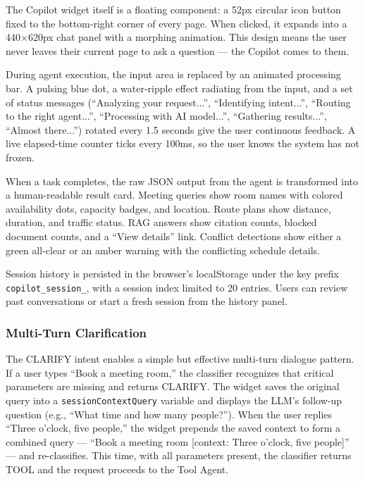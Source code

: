 The Copilot widget itself is a floating component: a 52px circular icon button fixed to the bottom-right corner of every page. When clicked, it expands into a 440$\times$620px chat panel with a morphing animation. This design means the user never leaves their current page to ask a question --- the Copilot comes to them.

During agent execution, the input area is replaced by an animated processing bar. A pulsing blue dot, a water-ripple effect radiating from the input, and a set of status messages (``Analyzing your request...'', ``Identifying intent...'', ``Routing to the right agent...'', ``Processing with AI model...'', ``Gathering results...'', ``Almost there...'') rotated every 1.5 seconds give the user continuous feedback. A live elapsed-time counter ticks every 100ms, so the user knows the system has not frozen.

When a task completes, the raw JSON output from the agent is transformed into a human-readable result card. Meeting queries show room names with colored availability dots, capacity badges, and location. Route plans show distance, duration, and traffic status. RAG answers show citation counts, blocked document counts, and a ``View details'' link. Conflict detections show either a green all-clear or an amber warning with the conflicting schedule details.

Session history is persisted in the browser's localStorage under the key prefix \texttt{copilot\_session\_}, with a session index limited to 20 entries. Users can review past conversations or start a fresh session from the history panel.

\subsubsection{Multi-Turn Clarification}

The CLARIFY intent enables a simple but effective multi-turn dialogue pattern. If a user types ``Book a meeting room,'' the classifier recognizes that critical parameters are missing and returns CLARIFY. The widget saves the original query into a \texttt{sessionContextQuery} variable and displays the LLM's follow-up question (e.g., ``What time and how many people?''). When the user replies ``Three o'clock, five people,'' the widget prepends the saved context to form a combined query --- ``Book a meeting room [context: Three o'clock, five people]'' --- and re-classifies. This time, with all parameters present, the classifier returns TOOL and the request proceeds to the Tool Agent.

